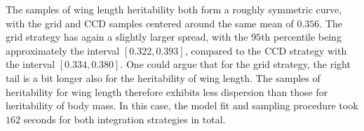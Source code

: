 \noindent The samples of wing length heritability both form a roughly symmetric curve, with the grid and CCD samples centered around the same mean of $0.356$. The grid strategy has again a slightly larger spread, with the $95$th percentile being approximately the interval $[0.322, 0.393]$, compared to the CCD strategy with the interval $[0.334, 0.380]$. One could argue that for the grid strategy, the right tail is a bit longer also for the heritability of wing length. The samples of heritability for wing length therefore exhibits less dispersion than those for heritability of body mass. In this case, the model fit and sampling procedure took $162$ seconds for both integration strategies in total.
